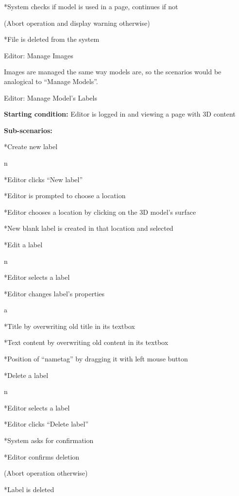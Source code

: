 *System checks if model is used in a page, continues if not

(Abort operation and display warning otherwise)

*File is deleted from the system

\enditems

\enditems

\secc Editor: Manage Images

Images are managed the same way models are, so the scenarios would be analogical to “Manage Models”.

\secc Editor: Manage Model's Labels

{\bf Starting condition:} Editor is logged in and viewing a page with 3D content

{\bf Sub-scenarios:}

\begitems

*Create new label

\begitems \style n

*Editor clicks “New label”

*Editor is prompted to choose a location

*Editor chooses a location by clicking on the 3D model’s surface

*New blank label is created in that location and selected

\enditems

*Edit a label

\begitems \style n

*Editor selects a label

*Editor changes label’s properties

\begitems \style a

*Title by overwriting old title in its textbox

*Text content by overwriting old content in its textbox

*Position of “nametag” by dragging it with left mouse button

\enditems

\enditems

*Delete a label

\begitems \style n

*Editor selects a label

*Editor clicks “Delete label”

*System asks for confirmation

*Editor confirms deletion

(Abort operation otherwise)

*Label is deleted

